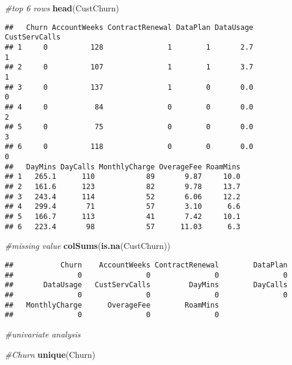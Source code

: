 \documentclass[]{article}
\newenvironment{Shaded}{\begin{snugshade}}{\end{snugshade}}
\newcommand{\KeywordTok}[1]{\textcolor[rgb]{0.13,0.29,0.53}{\textbf{#1}}}
\newcommand{\CommentTok}[1]{\textcolor[rgb]{0.56,0.35,0.01}{\textit{#1}}}
\newcommand{\NormalTok}[1]{#1}
\begin{document}
\begin{Shaded}
\begin{Highlighting}[]
\CommentTok{#top 6 rows }
\KeywordTok{head}\NormalTok{(CustChurn)}
\end{Highlighting}
\end{Shaded}

\begin{verbatim}
##   Churn AccountWeeks ContractRenewal DataPlan DataUsage CustServCalls
## 1     0          128               1        1       2.7             1
## 2     0          107               1        1       3.7             1
## 3     0          137               1        0       0.0             0
## 4     0           84               0        0       0.0             2
## 5     0           75               0        0       0.0             3
## 6     0          118               0        0       0.0             0
##   DayMins DayCalls MonthlyCharge OverageFee RoamMins
## 1   265.1      110            89       9.87     10.0
## 2   161.6      123            82       9.78     13.7
## 3   243.4      114            52       6.06     12.2
## 4   299.4       71            57       3.10      6.6
## 5   166.7      113            41       7.42     10.1
## 6   223.4       98            57      11.03      6.3
\end{verbatim}

\begin{Shaded}
\begin{Highlighting}[]
\CommentTok{#missing value}
\KeywordTok{colSums}\NormalTok{(}\KeywordTok{is.na}\NormalTok{(CustChurn))}
\end{Highlighting}
\end{Shaded}

\begin{verbatim}
##           Churn    AccountWeeks ContractRenewal        DataPlan 
##               0               0               0               0 
##       DataUsage   CustServCalls         DayMins        DayCalls 
##               0               0               0               0 
##   MonthlyCharge      OverageFee        RoamMins 
##               0               0               0
\end{verbatim}

\begin{Shaded}
\begin{Highlighting}[]
\CommentTok{#univariate analysis }

\CommentTok{#Churn}
\KeywordTok{unique}\NormalTok{(Churn)}
\end{Highlighting}
\end{Shaded}
\end{document}
